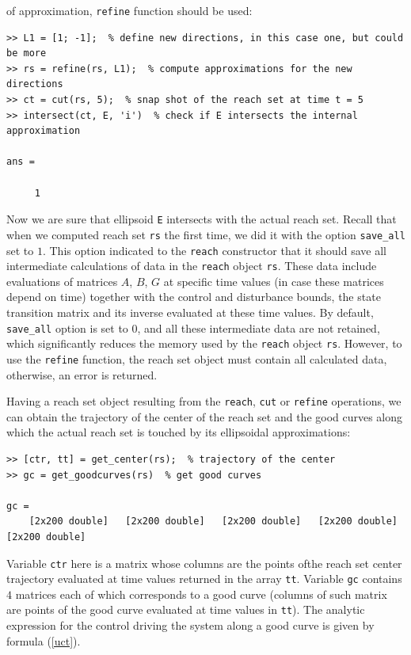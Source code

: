 \documentclass{report}
\begin{document}
of approximation, {\tt refine} function should be used:
{\tt \begin{verbatim}
>> L1 = [1; -1];  % define new directions, in this case one, but could be more
>> rs = refine(rs, L1);  % compute approximations for the new directions
>> ct = cut(rs, 5);  % snap shot of the reach set at time t = 5
>> intersect(ct, E, 'i')  % check if E intersects the internal approximation

ans =

     1
\end{verbatim} }
Now we are sure that ellipsoid {\tt E} intersects with the actual reach set.
Recall that when we computed reach set {\tt rs} the first time, we did it
with the option {\tt save\_all} set to $1$. This option indicated to the
{\tt reach} constructor that it should save all intermediate calculations of
data in the {\tt reach} object {\tt rs}. These data include evaluations
of matrices $A$, $B$, $G$ at specific time values (in case these
matrices depend on time) together with the control and disturbance
bounds, the state transition matrix and its inverse evaluated at
these time values.
By default, {\tt save\_all} option is set to $0$, and all these intermediate
data are not retained, which significantly reduces the memory used
by the {\tt reach} object {\tt rs}. However, to use the {\tt refine} function,
the reach set object must contain all calculated data, otherwise, an
error is returned.

Having a reach set object resulting from the {\tt reach}, {\tt cut} or
{\tt refine} operations, we can obtain the trajectory of the center
of the reach set and the good curves along which the actual reach set
is touched by its ellipsoidal approximations:
{\tt \begin{verbatim}
>> [ctr, tt] = get_center(rs);  % trajectory of the center
>> gc = get_goodcurves(rs)  % get good curves

gc =
    [2x200 double]   [2x200 double]   [2x200 double]   [2x200 double]   [2x200 double]
\end{verbatim} }
Variable {\tt ctr} here is a matrix whose columns are the points ofthe
reach set center trajectory evaluated at time values returned in the
array {\tt tt}. Variable {\tt gc} contains $4$ matrices each of which
corresponds to a good curve (columns of such matrix are points of the
good curve evaluated at time values in {\tt tt}).
The analytic expression for the control driving the system along a good
curve is given by formula (\ref{uct}).
\end{document}
